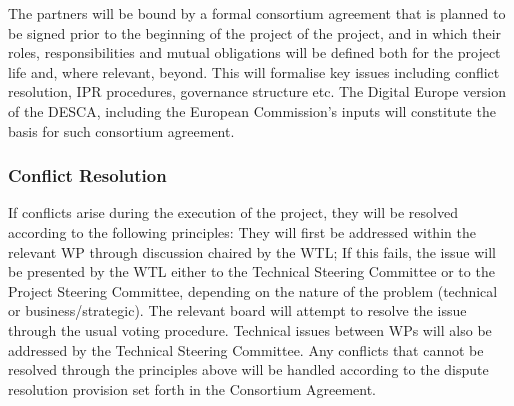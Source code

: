\documentclass[a4paper,11pt]{article}
\begin{document}
The partners will be bound by a formal consortium agreement that is
planned to be signed prior to the beginning of the project of the project,
and in which their roles, responsibilities and mutual obligations will be
defined both for the project life and, where relevant, beyond.  This will
formalise key issues including conflict resolution, IPR procedures, governance structure
etc.  %
The Digital Europe version of the DESCA, including the European Commission's
inputs will constitute the basis for such consortium agreement.

\subsubsection*{Conflict Resolution}
\label{conflict-resolution}
If conflicts arise during the execution of the project, they will be resolved according to the following principles:
% 
They will first be addressed within the relevant WP through discussion chaired by the WTL;
If this fails, the issue will be presented by the WTL either to the Technical Steering Committee
or to the Project Steering Committee, depending on the nature of the problem (technical or business/strategic).
The relevant board will attempt to resolve the issue through the usual voting procedure.
%
Technical issues between WPs will also be addressed by the Technical Steering Committee.
Any conflicts that cannot be resolved through the principles above will
be handled according to the dispute resolution provision set forth in the
Consortium Agreement.

\end{document}
